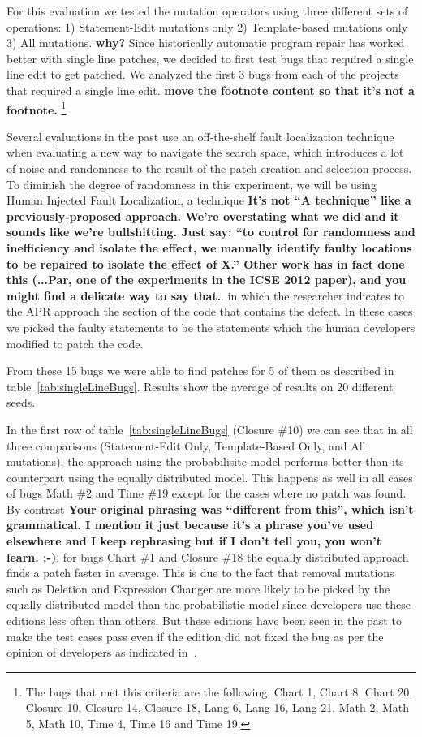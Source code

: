 \documentclass[conference]{IEEEtran}
\newcommand{\todo}[1]
  {{\scriptsize \textbf{\color{red} {#1}}}}
\begin{document}
{For this evaluation we tested the mutation operators using three different sets 
of operations: 1) Statement-Edit mutations only 2) Template-based mutations 
only 3) All mutations.  \todo{why?}
Since historically automatic program repair has worked better with single line 
patches, we decided to first test bugs that required a single line edit to get 
patched. We analyzed the first 3 bugs from each of the projects that required a 
single line edit.\todo{move the footnote content so that it's not a footnote.} \footnote{The bugs that met this criteria are the following: Chart 1, 
Chart 8, Chart 20, Closure 10, Closure 14, Closure 18, Lang 6, Lang 16, Lang 21, 
Math 2, Math 5, Math 10, Time 4, Time 16 and Time 19.}

Several evaluations in the past use an off-the-shelf fault localization
technique when evaluating a new way to navigate the search space, which
introduces a lot of noise and randomness to the result of the patch creation and
selection process. To diminish the degree of randomness in this experiment, we
will be using Human Injected Fault Localization, a technique\todo{It's not ``A
  technique'' like a previously-proposed approach.  We're
  overstating what we did and it sounds like we're bullshitting.  Just say: ``to
  control for randomness and inefficiency and isolate the effect, we manually
  identify faulty locations to be repaired to isolate the effect of X.''  Other
  work has in fact done this (...Par, one of the experiments in the ICSE 2012
  paper), and you might find a delicate way to say that.}. in which the
researcher indicates to the APR approach the section of the code that contains
the defect. In these cases we picked the faulty statements to be the statements
which the human developers modified to patch the code. 

From these 15 bugs we were able to find patches for 5 of them as described in
table~\ref{tab:singleLineBugs}. Results show the average of results on 
20 different seeds.  

In the first row of table~\ref{tab:singleLineBugs} (Closure \#10) we can see
that in all three comparisons (Statement-Edit Only, Template-Based Only, and All
mutations), the approach using the probabilisitc model performs better than its
counterpart using the equally distributed model. This happens as well in all
cases of bugs Math \#2 and Time \#19 except for the cases where no patch was
found. By contrast \todo{Your original phrasing was ``different from this'',
  which isn't grammatical.  I
  mention it just because it's a phrase you've used elsewhere and I keep
  rephrasing but if I don't tell you, you won't learn. ;-)}, for bugs Chart \#1 and Closure \#18 the equally
distributed approach finds a patch faster in average. This is due to the fact
that removal mutations such as Deletion and Expression Changer are more likely
to be picked by the equally distributed model than the probabilistic model since
developers use these editions less often than others. But these editions have
been seen in the past to make the test cases pass even if the edition did not
fixed the bug as per the opinion of developers as indicated in~\cite{kim2013}. 

}
\end{document}
